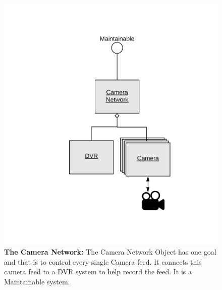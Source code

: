 \documentclass[12pt]{article}
\begin{document}
\begin{figure}[H]
    \centerline{\includegraphics[scale=.20]{CameraNetwork.png}}
    \caption{\textbf{The Camera Network: }The Camera Network Object has one goal and that is to control every single Camera feed. 
It connects this camera feed to a DVR system to help record the feed. It is a Maintainable system.}
    \label{fig:CameraNetwork}
\end{figure}    
\end{document}
